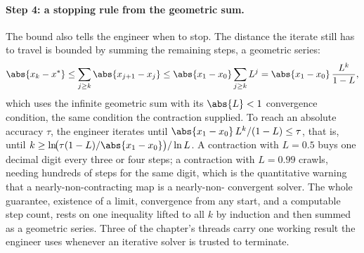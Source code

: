 \paragraph{Step 4: a stopping rule from the geometric sum.} The bound
also tells the engineer when to stop. The distance the iterate still has
to travel is bounded by summing the remaining steps, a geometric series:
\[
\abs{x_{k} - x^{\ast}}
\leq \sum_{j \geq k} \abs{x_{j+1} - x_{j}}
\leq \abs{x_{1} - x_{0}} \sum_{j \geq k} L^{j}
= \abs{x_{1} - x_{0}} \, \frac{L^{k}}{1 - L},
\]
which uses the infinite geometric sum with its $\abs{L} < 1$ convergence
condition, the same condition the contraction supplied. To reach an
absolute accuracy $\tau$, the engineer iterates until $\abs{x_{1} -
x_{0}}\, L^{k}/(1 - L) \leq \tau$, that is, until $k \geq \ln\!\bigl(\tau
(1 - L)/\abs{x_{1} - x_{0}}\bigr)/\ln L$. A contraction with $L = 0.5$
buys one decimal digit every three or four steps; a contraction with $L =
0.99$ crawls, needing hundreds of steps for the same digit, which is the
quantitative warning that a nearly-non-contracting map is a nearly-non-
convergent solver. The whole guarantee, existence of a limit, convergence
from any start, and a computable step count, rests on one inequality
lifted to all $k$ by induction and then summed as a geometric series.
Three of the chapter's threads carry one working result the engineer
uses whenever an iterative solver is trusted to terminate.

